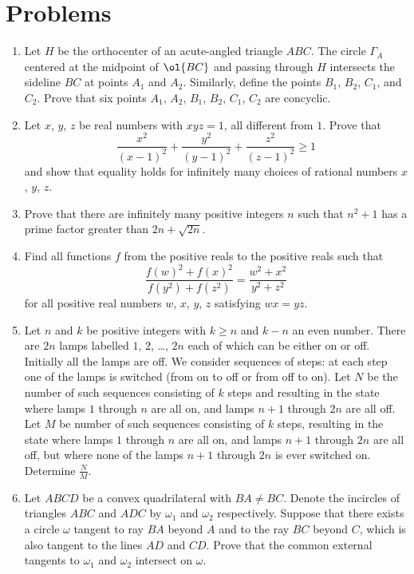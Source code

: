 \documentclass[11pt]{scrartcl}
\begin{document}
\section{Problems}
\begin{enumerate}[\bfseries 1.]
\item %
Let $H$ be the orthocenter of an acute-angled triangle $ABC$.
The circle $\Gamma_{A}$ centered at the midpoint of $\ol{BC}$ and passing
through $H$ intersects the sideline $BC$ at points  $A_1$ and $A_2$.
Similarly, define the points $B_1$, $B_2$, $C_1$, and $C_2$.
Prove that six points $A_1$, $A_2$, $B_1$, $B_2$, $C_1$, $C_2$ are concyclic.

\item %
Let $x$, $y$, $z$ be real numbers with $xyz = 1$,
all different from $1$.
Prove that
\[ \frac{x^2}{(x-1)^2} + \frac{y^2}{(y-1)^2}
+ \frac{z^2}{(z-1)^2} \ge 1 \]
and show that equality holds for infinitely many choices
of rational numbers $x$, $y$, $z$.

\item %
Prove that there are infinitely many positive integers $n$
such that $n^2+1$ has a prime factor greater than $2n + \sqrt{2n}$.

\item %
Find all functions $f$ from the positive reals to the positive reals such that
\[ \frac{f(w)^2 + f(x)^2}{f(y^2)+f(z^2)} = \frac{w^2+x^2}{y^2+z^2} \]
for all positive real numbers $w$, $x$, $y$, $z$ satisfying $wx=yz$.

\item %
Let $n$ and $k$ be positive integers with $k \geq n$ and $k - n$ an even number.
There are $2n$ lamps labelled $1$, $2$, \dots, $2n$ each of which can be either on or off.
Initially all the lamps are off.
We consider sequences of steps: at each step one of the lamps is switched
(from on to off or from off to on).
Let $N$ be the number of such sequences consisting of $k$ steps
and resulting in the state where lamps $1$ through $n$ are all on,
and lamps $n + 1$ through $2n$ are all off.
Let $M$ be number of such sequences consisting of $k$ steps,
resulting in the state where lamps $1$ through $n$ are all on,
and lamps $n + 1$ through $2n$ are all off,
but where none of the lamps $n + 1$ through $2n$ is ever switched on.
Determine $\frac{N}{M}$.

\item %
Let $ABCD$ be a convex quadrilateral with $BA \neq BC$.
Denote the incircles of triangles $ABC$ and $ADC$
by $\omega_1$ and $\omega_2$ respectively.
Suppose that there exists a circle $\omega$ tangent
to ray $BA$ beyond $A$ and to the ray $BC$ beyond $C$,
which is also tangent to the lines $AD$ and $CD$.
Prove that the common external tangents to
$\omega_1$ and $\omega_2$ intersect on $\omega$.

\end{enumerate}
\pagebreak
\end{document}
